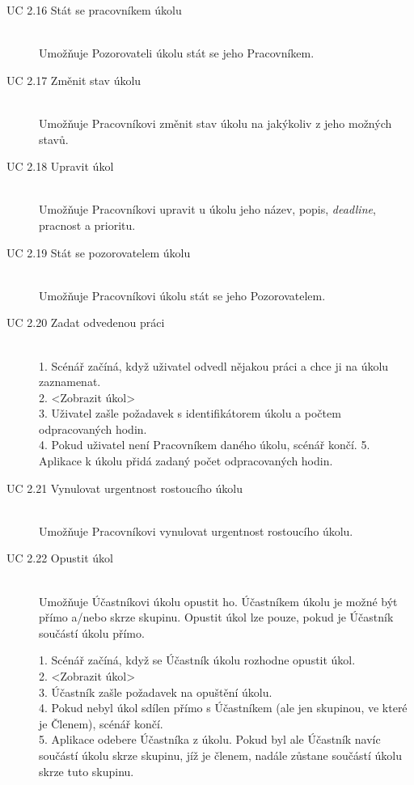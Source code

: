\documentclass[thesis=B,czech]{FITthesis}[2012/06/26]
\begin{document}
\begin{description}
				
				\item[UC 2.16 Stát se pracovníkem úkolu] \hfill \\
					Umožňuje Pozorovateli úkolu stát se jeho Pracovníkem.				
								
				\item[UC 2.17 Změnit stav úkolu] \hfill \\
					Umožňuje Pracovníkovi změnit stav úkolu na jakýkoliv z jeho možných stavů.
				
				\item[UC 2.18 Upravit úkol] \hfill \\
					Umožňuje Pracovníkovi upravit u úkolu jeho název, popis, \textit{deadline}, pracnost a prioritu.
				
				\item[UC 2.19 Stát se pozorovatelem úkolu] \hfill \\
					Umožňuje Pracovníkovi úkolu stát se jeho Pozorovatelem.
					
				\item[UC 2.20 Zadat odvedenou práci] \hfill \\
					1. Scénář začíná, když uživatel odvedl nějakou práci a chce ji na úkolu zaznamenat. \\
					2. <Zobrazit úkol> \\
					3. Uživatel zašle požadavek s identifikátorem úkolu a počtem odpracovaných hodin. \\
					4. Pokud uživatel není Pracovníkem daného úkolu, scénář končí.
					5. Aplikace k úkolu přidá zadaný počet odpracovaných hodin. \\
					
				\item[UC 2.21 Vynulovat urgentnost rostoucího úkolu] \hfill \\
					Umožňuje Pracovníkovi vynulovat urgentnost rostoucího úkolu.
					
				\item[UC 2.22 Opustit úkol] \hfill \\
					Umožňuje Účastníkovi úkolu opustit ho. Účastníkem úkolu je možné být přímo a/nebo skrze skupinu. Opustit úkol lze pouze, pokud je Účastník součástí úkolu přímo.
				
					1. Scénář začíná, když se Účastník úkolu rozhodne opustit úkol. \\
					2. <Zobrazit úkol> \\
					3. Účastník zašle požadavek na opuštění úkolu. \\
					4. Pokud nebyl úkol sdílen přímo s Účastníkem (ale jen skupinou, ve které je Členem), scénář končí. \\
					5. Aplikace odebere Účastníka z úkolu. Pokud byl ale Účastník navíc součástí úkolu skrze skupinu, jíž je členem, nadále zůstane součástí úkolu skrze tuto skupinu.
			\end{description}
			
\end{document}

